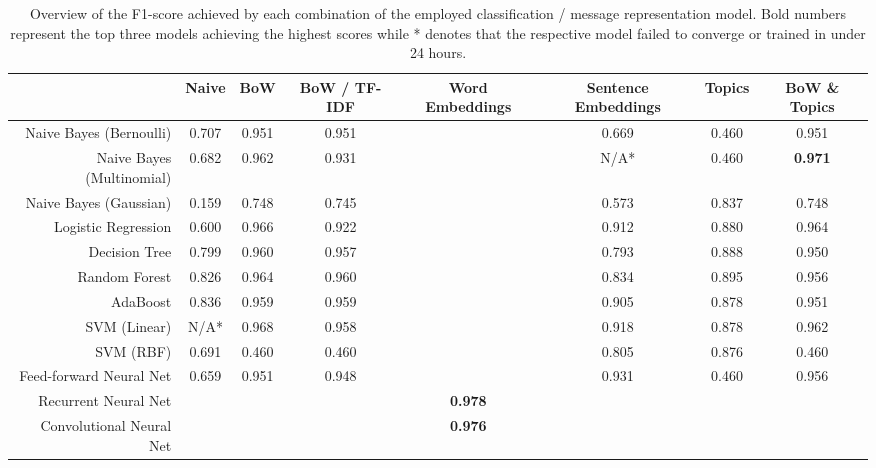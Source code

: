 \documentclass[letterpaper]{article}
\begin{document}
\begin{landscape}
	\begin{table}[t!]
		\centering
		\caption{Overview of the F1-score achieved by each combination of the employed classification / message representation model. Bold numbers represent the top three models achieving the highest scores while * denotes that the respective model failed to converge or trained in under 24 hours.}
		\label{tb: macro_f1}
		\begin{tabular}{@{}rccccccc@{}}
			\toprule
			                                               & Naive & BoW & BoW / TF-IDF & Word Embeddings & Sentence Embeddings & Topics & BoW \& Topics \\ \midrule
			\multicolumn{1}{r|}{Naive Bayes (Bernoulli)}   & 0.707 & 0.951 & 0.951        &                 & 0.669               & 0.460  & 0.951         \\
			\multicolumn{1}{r|}{Naive Bayes (Multinomial)} & 0.682 & 0.962 & 0.931        &                 & N/A*                & 0.460  & \textbf{0.971}\\
			\multicolumn{1}{r|}{Naive Bayes (Gaussian)}    & 0.159 & 0.748 & 0.745        &                 & 0.573               & 0.837  & 0.748         \\
			\multicolumn{1}{r|}{Logistic Regression}       & 0.600 & 0.966 & 0.922        &                 & 0.912               & 0.880  & 0.964         \\
			\hline
			\multicolumn{1}{r|}{Decision Tree}             & 0.799 & 0.960 & 0.957        &                 & 0.793               & 0.888  & 0.950         \\
			\multicolumn{1}{r|}{Random Forest}             & 0.826 & 0.964 & 0.960        &                 & 0.834               & 0.895  & 0.956         \\
			\multicolumn{1}{r|}{AdaBoost}                  & 0.836 & 0.959 & 0.959        &                 & 0.905               & 0.878  & 0.951         \\
			\multicolumn{1}{r|}{SVM (Linear)}              & N/A*   & 0.968 & 0.958        &                 & 0.918               & 0.878  & 0.962         \\
			\multicolumn{1}{r|}{SVM (RBF)}                 & 0.691 & 0.460 & 0.460        &                 & 0.805               & 0.876  & 0.460         \\
			\hline
			\multicolumn{1}{r|}{Feed-forward Neural Net}   & 0.659 & 0.951 & 0.948        &                 & 0.931               & 0.460  & 0.956         \\
			\multicolumn{1}{r|}{Recurrent Neural Net}      &       &     &              & \textbf{0.978}  &                     &        &               \\
			\multicolumn{1}{r|}{Convolutional Neural Net}  &       &     &              & \textbf{0.976}  &                     &        &               \\ \bottomrule
		\end{tabular}
	\end{table}
\end{landscape}
\end{document}
